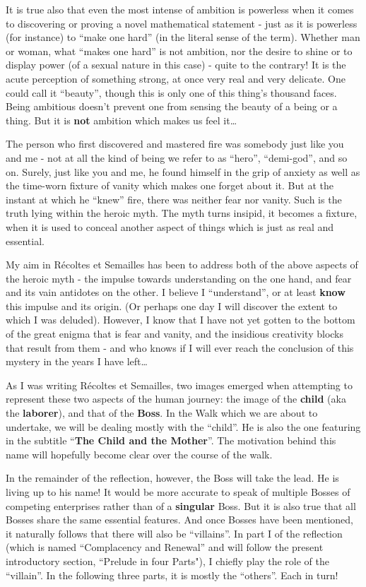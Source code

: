 It is true also that even the most intense of ambition is
powerless when it comes to discovering or proving a novel mathematical statement - just as it is
powerless (for instance) to ``make one hard'' (in the literal sense of the term).
Whether man or woman, what ``makes one hard'' is not ambition, nor the desire to shine or to
display power (of a sexual nature in this case) - quite to the contrary!
It is the acute perception of something strong, at once very real and very delicate. 
One could call it ``beauty'', though this is only one of
this thing's thousand faces. Being ambitious doesn't prevent one from 
sensing the beauty of a being or a thing. But it is \textbf{not} ambition which makes us
feel it\ldots 

The person who first discovered and mastered fire was somebody just like you and me -
not at all the kind of being we refer to as ``hero'', ``demi-god'', and so on.  
Surely, just like you and me, he found himself in the grip of anxiety as well as the 
time-worn fixture of vanity which makes one forget about it.
But at the instant at which he ``knew'' fire, there was neither fear nor vanity. 
Such is the truth lying within the heroic myth.
The myth turns insipid, it becomes a fixture, when it is used
to conceal another aspect of things which is just as real and essential. 

My aim in R\'ecoltes et Semailles has been to address both of the above aspects of the heroic myth - 
the impulse towards understanding on the one hand, and fear and its vain antidotes on the other. 
I believe I ``understand'', or at least \textbf{know} this impulse and its origin. (Or
perhaps one day I will discover the extent to which I was deluded).  
However, I know that I have not yet gotten to the bottom of the great enigma that is fear and vanity, 
and the insidious creativity blocks that result from them - 
and who knows if I will ever reach the conclusion of this mystery in the years I have
left\ldots

As I was writing 
R\'ecoltes et Semailles, 
two images emerged when attempting to represent these two aspects of the human journey:
the image of the \textbf{child} (aka the \textbf{laborer}), and that of the
\textbf{Boss}.
In the Walk which we are about to undertake, we will be dealing mostly with the ``child''.
He is also the one featuring in the subtitle ``\textbf{The Child and the Mother}''. 
The motivation behind this name 
will hopefully become clear over the course of the walk.

In the remainder of the reflection, however, the Boss will take the lead. 
He is living up to his name! It would be more accurate 
to speak of multiple Bosses of competing enterprises rather than of a \textbf{singular}
Boss.
But it is also true that all Bosses share the same essential features.
And once Bosses have been mentioned, it naturally follows that there will also be ``villains''.
In part I of the reflection (which is named ``Complacency and Renewal'' and will follow the present
introductory section, ``Prelude in four Parts"), I chiefly play the role of the ``villain''. In the following
three parts, it is mostly the ``others''. 
Each in turn!

